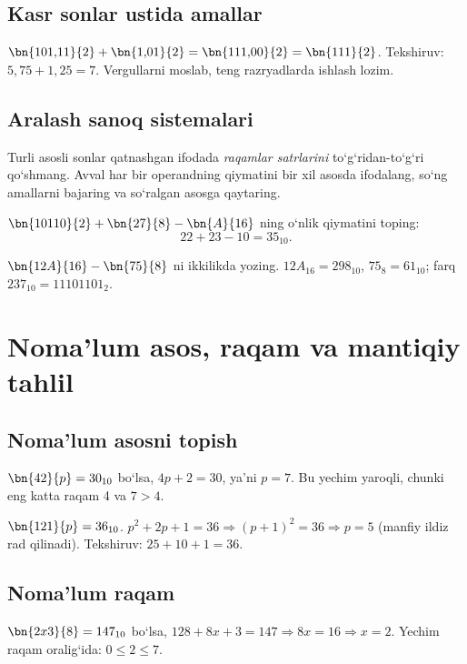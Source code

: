 \documentclass[11pt,a4paper,openany,oneside]{book}
\begin{document}
\section{Kasr sonlar ustida amallar}
\begin{worked}
\(\bn{101{,}11}{2}+\bn{1{,}01}{2}=\bn{111{,}00}{2}=\bn{111}{2}\). Tekshiruv: \(5{,}75+1{,}25=7\). Vergullarni moslab, teng razryadlarda ishlash lozim. 
\end{worked}
\section{Aralash sanoq sistemalari}
\begin{important}
Turli asosli sonlar qatnashgan ifodada \emph{raqamlar satrlarini} to‘g‘ridan-to‘g‘ri qo‘shmang. Avval har bir operandning qiymatini bir xil asosda ifodalang, so‘ng amallarni bajaring va so‘ralgan asosga qaytaring.
\end{important}
\begin{worked}
\(\bn{10110}{2}+\bn{27}{8}-\bn{A}{16}\) ning o‘nlik qiymatini toping:
\[22+23-10=\boxed{35_{10}}.\]
\end{worked}
\begin{worked}
\(\bn{12A}{16}-\bn{75}{8}\) ni ikkilikda yozing. \(12A_{16}=298_{10}\), \(75_8=61_{10}\); farq \(237_{10}=\boxed{11101101_2}\).
\end{worked}

\chapter{Noma’lum asos, raqam va mantiqiy tahlil}
\section{Noma’lum asosni topish}
\begin{worked}
\(\bn{42}{p}=30_{10}\) bo‘lsa, \(4p+2=30\), ya’ni \(p=7\). Bu yechim yaroqli, chunki eng katta raqam 4 va \(7>4\).
\end{worked}
\begin{worked}
\(\bn{121}{p}=36_{10}\). \(p^2+2p+1=36\Rightarrow(p+1)^2=36\Rightarrow p=5\) (manfiy ildiz rad qilinadi). Tekshiruv: \(25+10+1=36\).
\end{worked}
\section{Noma’lum raqam}\begin{worked}
\(\bn{2x3}{8}=147_{10}\) bo‘lsa, \(128+8x+3=147\Rightarrow8x=16\Rightarrow x=2\). Yechim raqam oralig‘ida: \(0\le2\le7\).
\end{worked}
\end{document}
